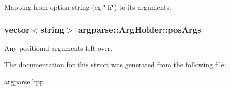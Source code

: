 Mapping from option string (eg \char`\"{}-\/h\char`\"{}) to its arguments. 

\hypertarget{structargparse_1_1_arg_holder_a3154d09426a4270992d6b54cc1eb2927}{
\subsubsection[{pos\-Args}]{\setlength{\rightskip}{0pt plus 5cm}vector$<$string$>$ {\bf argparse\-::\-Arg\-Holder\-::pos\-Args}}}\label{structargparse_1_1_arg_holder_a3154d09426a4270992d6b54cc1eb2927}


Any positional arguments left over. 



The documentation for this struct was generated from the following file\-:\begin{DoxyCompactItemize}
\item 
\hyperlink{argparse_8hpp}{argparse.\-hpp}\end{DoxyCompactItemize}
